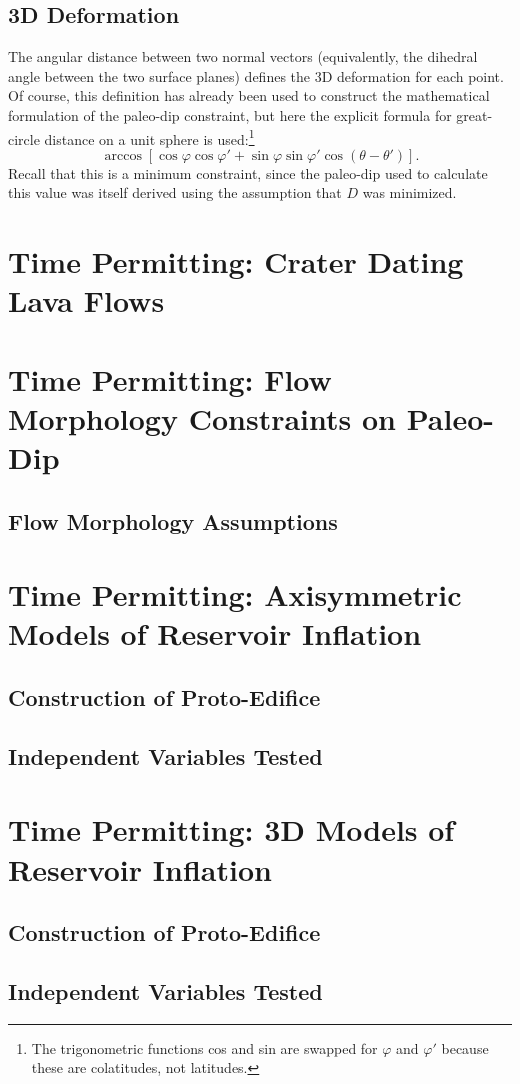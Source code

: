 \subsection{3D Deformation}
The angular distance between two normal vectors (equivalently, the dihedral angle between the two surface planes) defines the 3D deformation for each point. Of course, this definition has already been used to construct the mathematical formulation of the paleo-dip constraint, but here the explicit formula for great-circle distance on a unit sphere is used:\footnote{The trigonometric functions cos and sin are swapped for $\varphi$ and $\varphi'$ because these are colatitudes, not latitudes.}
\begin{equation}
    \arccos\left[\cos\varphi\cos\varphi'+\sin\varphi\sin\varphi'\cos(\theta-\theta')\right].
\end{equation}
Recall that this is a minimum constraint, since the paleo-dip used to calculate this value was itself derived using the assumption that $D$ was minimized.
\section{Time Permitting: Crater Dating Lava Flows}
\section{Time Permitting: Flow Morphology Constraints on Paleo-Dip}
\subsection{Flow Morphology Assumptions}
\section{Time Permitting: Axisymmetric Models of Reservoir Inflation}
\subsection{Construction of Proto-Edifice}
\subsection{Independent Variables Tested}
\section{Time Permitting: 3D Models of Reservoir Inflation}
\subsection{Construction of Proto-Edifice}
\subsection{Independent Variables Tested}
